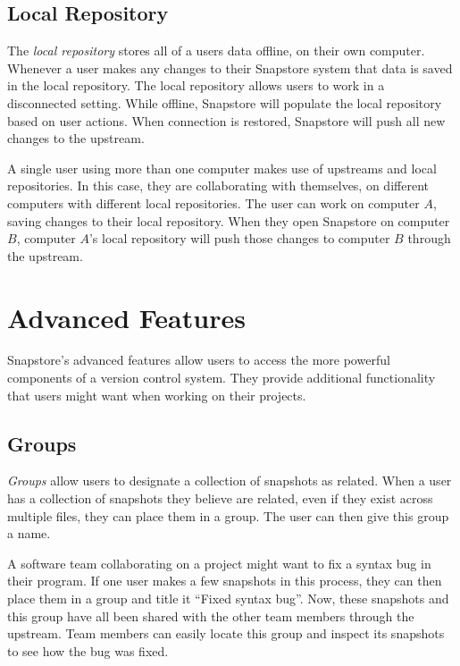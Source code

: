 \subsection{Local Repository}

The \textit{local repository} stores all of a users data offline, on their own computer. Whenever a user makes any changes to their Snapstore system that data is saved in the local repository. The local repository allows users to work in a disconnected setting. While offline, Snapstore will populate the local repository based on user actions. When connection is restored, Snapstore will push all new changes to the upstream.

A single user using more than one computer makes use of upstreams and local repositories. In this case, they are collaborating with themselves, on different computers with different local repositories. The user can work on computer $A$, saving changes to their local repository. When they open Snapstore on computer $B$, computer $A$'s local repository will push those changes to computer $B$ through the upstream.

\section{Advanced Features}

Snapstore's advanced features allow users to access the more powerful components of a version control system. They provide additional functionality that users might want when working on their projects.

\subsection{Groups}

\textit{Groups} allow users to designate a collection of snapshots as related. When a user has a collection of snapshots they believe are related, even if they exist across multiple files, they can place them in a group. The user can then give this group a name.

A software team collaborating on a project might want to fix a syntax bug in their program. If one user makes a few snapshots in this process, they can then place them in a group and title it ``Fixed syntax bug''. Now, these snapshots and this group have all been shared with the other team members through the upstream. Team members can easily locate this group and inspect its snapshots to see how the bug was fixed. 

